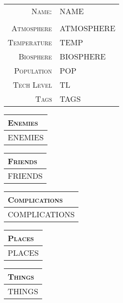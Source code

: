 \documentclass[12pt,letterpaper,twocolumn]{article}
\begin{document}
\begin{tabularx}{\linewidth}{ r | X |}
    \cline{2-2}
    \textsc{Name:} & NAME \\
    \cline{2-2}
    \multicolumn{2}{c}{} \\
    \cline{2-2}
    \textsc{Atmosphere} & ATMOSPHERE \\
    \cline{2-2}
    \textsc{Temperature} & TEMP \\
    \cline{2-2}
    \textsc{Biosphere} & BIOSPHERE \\
    \cline{2-2}
    \textsc{Population} & POP \\
    \cline{2-2}
    \textsc{Tech Level} & TL \\
    \cline{2-2}
    \textsc{Tags} & TAGS \\
    \cline{2-2}
\end{tabularx}

\begin{tabularx}{\linewidth}{| X |}
    \multicolumn{1}{l}{\textsc{Enemies}} \\
    \hline
    ENEMIES \\
    \hline
\end{tabularx}

\begin{tabularx}{\linewidth}{| X |}
    \multicolumn{1}{l}{\textsc{Friends}} \\
    \hline
    FRIENDS \\
    \hline
\end{tabularx}

\begin{tabularx}{\linewidth}{| X |}
    \multicolumn{1}{l}{\textsc{Complications}} \\
    \hline
    COMPLICATIONS \\
    \hline
\end{tabularx}

\begin{tabularx}{\linewidth}{| X |}
    \multicolumn{1}{l}{\textsc{Places}} \\
    \hline
    PLACES \\
    \hline
\end{tabularx}

\begin{tabularx}{\linewidth}{| X |}
    \multicolumn{1}{l}{\textsc{Things}} \\
    \hline
    THINGS \\
    \hline
\end{tabularx}
\end{document}
